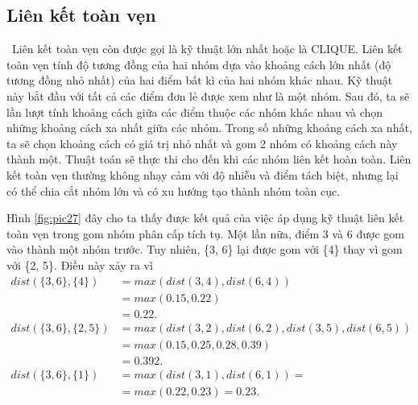 \subsection{Liên kết toàn vẹn}		
~\cite{Vipin-Kumar, HAC, AHC, hierarchical-clustering, single-complete}Liên kết toàn vẹn còn được gọi là kỹ thuật lớn nhất hoặc là CLIQUE.
Liên kết toàn vẹn tính độ tương đồng của hai nhóm dựa vào khoảng cách lớn nhất (độ tương đồng nhỏ nhất) của hai điểm bất kì của hai nhóm khác nhau.
Kỹ thuật này bắt đầu với tất cả các điểm đơn lẻ được xem như là một nhóm.
Sau đó, ta sẽ lần lượt tính khoảng cách giữa các điểm thuộc các nhóm khác nhau và chọn những khoảng cách xa nhất giữa các nhóm.
Trong số những khoảng cách xa nhất, ta sẽ chọn khoảng cách có giá trị nhỏ nhất và gom 2 nhóm có khoảng cách này thành một.
Thuật toán sẽ thực thi cho đến khi các nhóm liên kết hoàn toàn.
Liên kết toàn vẹn thường không nhạy cảm với độ nhiễu và điểm tách biệt, nhưng lại có thể chia cắt nhóm lớn và có xu hướng tạo thành nhóm toàn cục.

Hình \ref{fig:pic27} đây cho ta thấy được kết quả của việc áp dụng kỹ thuật liên kết toàn vẹn trong gom nhóm phân cấp tích tụ.
Một lần nữa, điểm 3 và 6 được gom vào thành một nhóm trước.
Tuy nhiên, \{3, 6\} lại được gom với \{4\} thay vì gom với \{2, 5\}.
Điều này xảy ra vì 
\begin{equation}
\begin{aligned}
dist(\{3, 6\}, \{4\})
&= max(dist(3, 4), dist(6, 4)) 		\\
&= max(0.15, 0.22) 					\\
&= 0.22.							\\
dist(\{3, 6\}, \{2, 5\})
&= max(dist(3, 2), dist(6, 2), dist(3, 5), dist(6, 5))			\\
&= max(0.15, 0.25, 0.28, 0.39)									\\
&= 0.392.										\\					
dist(\{3, 6\}, \{1\})
&= max(dist(3, 1), dist(6, 1)) =	\\ 
&= max(0.22, 0.23) = 0.23.		\\
\end{aligned}
\end{equation}

